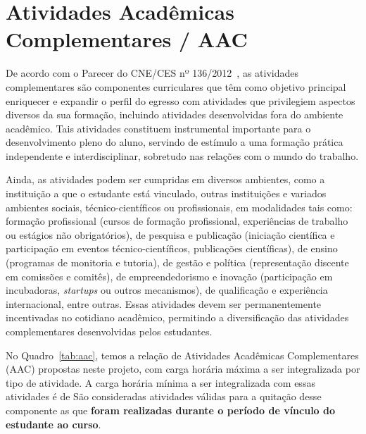 \section{Atividades Acadêmicas Complementares / AAC}
\label{sec:AAC}

De acordo com o Parecer do CNE/CES nº 136/2012~\cite{cne_ces_parecer_136_2012}, as atividades complementares são componentes curriculares que têm como objetivo principal enriquecer e expandir o perfil do egresso com atividades que privilegiem aspectos diversos da sua formação, incluindo atividades desenvolvidas fora do ambiente acadêmico. Tais atividades constituem instrumental importante para o desenvolvimento pleno do aluno, servindo de estímulo a uma formação prática independente e interdisciplinar, sobretudo nas relações com o mundo do trabalho.

Ainda, as atividades podem ser cumpridas em diversos ambientes, como a instituição a que o estudante está vinculado, outras instituições e variados ambientes sociais, técnico-científicos ou profissionais, em modalidades tais como: formação profissional (cursos de formação profissional, experiências de trabalho ou estágios não obrigatórios), de pesquisa e publicação (iniciação científica e participação em eventos técnico-científicos, publicações científicas), de ensino (programas de monitoria e tutoria), de gestão e política (representação discente em comissões e comitês), de empreendedorismo e inovação (participação em incubadoras, \textit{startups} ou outros mecanismos), de qualificação e experiência internacional, entre outras. Essas atividades devem ser permanentemente incentivadas no cotidiano acadêmico, permitindo a diversificação das atividades complementares desenvolvidas pelos estudantes.

No Quadro~\ref{tab:aac}, temos a relação de Atividades Acadêmicas Complementares (AAC) propostas neste projeto, com carga horária máxima a ser integralizada por tipo de atividade. A carga horária mínima a ser integralizada com essas atividades é de  São consideradas atividades válidas para a quitação desse componente as que \textbf{foram realizadas durante o período de vínculo do estudante ao curso}.

